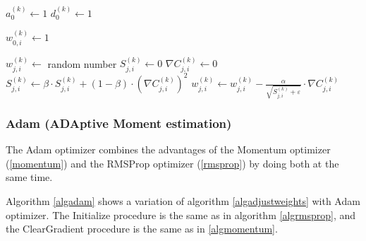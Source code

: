 \documentclass[titlepage]{article}
\begin{document}
        \begin{algorithm}
          \caption{%
            Modified version of algorithm \ref{alginit} and
            \ref{algadjustweights} with RMSProp.
          } \label{algrmsprop}
          \begin{algorithmic}
                \State $a_0^{(k)} \gets 1$
                \State $d_0^{(k)} \gets 1$
              \EndFor

                  \State $w_{0,i}^{(k)} \gets 1$

                    \State $w_{j,i}^{(k)} \gets$ random number
                    \State $S_{j,i}^{(k)} \gets 0$
                    \State $\nabla C_{j,i}^{(k)} \gets 0$
                  \EndFor
                \EndFor
              \EndFor
            \EndProcedure
                    \State $
                      S_{j,i}^{(k)} \gets
                        \beta \cdot S_{j,i}^{(k)}
                        + \left( 1 - \beta \right)
                        \cdot \left( \nabla C_{j,i}^{(k)} \right)^2
                    $
                    \State $
                      w_{j,i}^{(k)} \gets
                        w_{j,i}^{(k)}
                        - \frac{\alpha}{\sqrt{S_{j,i}^{(k)} + \varepsilon}}
                        \cdot \nabla C_{j,i}^{(k)}
                    $
                  \EndFor
                \EndFor
              \EndFor
            \EndProcedure
          \end{algorithmic}
        \end{algorithm}

      \subsubsection{Adam (ADAptive Moment estimation)}

        The Adam optimizer combines the advantages of the Momentum optimizer
        (\ref{momentum}) and the RMSProp optimizer (\ref{rmsprop}) by doing
        both at the same time.

        Algorithm \ref{algadam} shows a variation of algorithm
        \ref{algadjustweights} with Adam optimizer. The Initialize procedure is
        the same as in algorithm \ref{algrmsprop}, and the ClearGradient
        procedure is the same as in \ref{algmomentum}.
\end{document}

